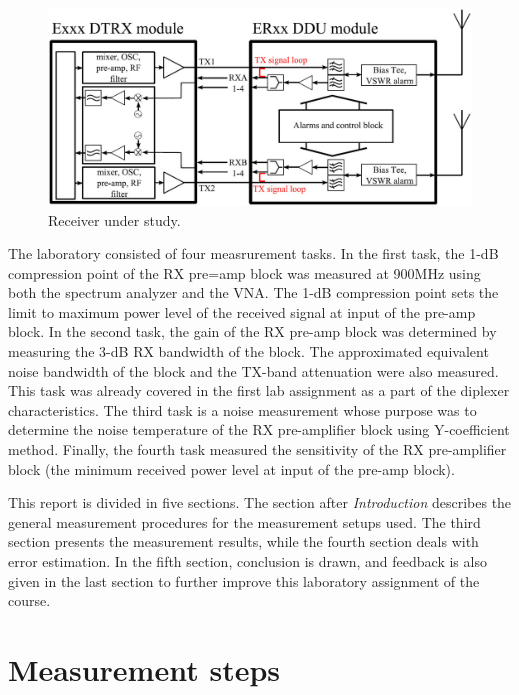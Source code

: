 \documentclass[a4paper, 12pt]{article}
\begin{document}
\begin{figure}[h!]
	\begin{center}
	\includegraphics[scale=0.3]{img/bs.jpg}
	\caption{Receiver under study.}
	\label{f:bs}
	\end{center}
	\vspace*{-12pt}
\end{figure}

The laboratory consisted of four measrurement tasks. In the first task, the 1-dB compression point of the RX pre=amp block was measured at 900MHz using both the spectrum analyzer and the VNA. The 1-dB compression point sets the limit to maximum power level of the received signal at input of the pre-amp block. In the second task, the gain of the RX pre-amp block was determined by measuring the 3-dB RX bandwidth of the block. The approximated equivalent noise bandwidth of the block and the TX-band attenuation were also measured. This task was already covered in the first lab assignment as a part of the diplexer characteristics. The third task is a noise measurement whose purpose was to determine the noise temperature of the RX pre-amplifier block using Y-coefficient method. Finally, the fourth task measured the sensitivity of the RX pre-amplifier block (the minimum received power level at input of the pre-amp block).

This report is divided in five sections. The section after \textit{Introduction} describes the general measurement procedures for the measurement setups used. The third section presents the measurement results, while the fourth section deals with error estimation. In the fifth section, conclusion is drawn, and feedback is also given in the last section to further improve this laboratory assignment of the course.
\\



\newpage
\section{Measurement steps}
\end{document}
